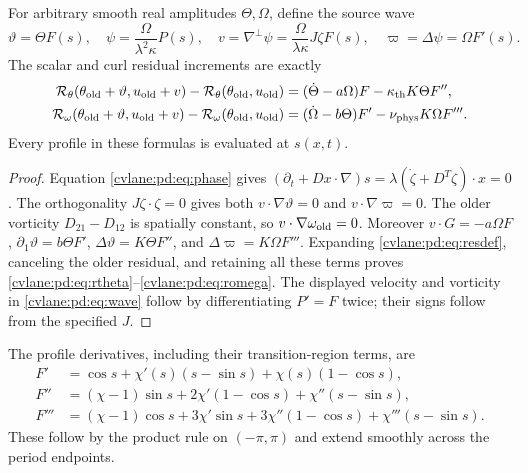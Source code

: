 \begin{cvlanepdproposition}\label{cvlane:pd:prop:res}
For arbitrary smooth real amplitudes $\Theta,\Omega$, define the source wave
\begin{equation}\label{cvlane:pd:eq:wave}
 \vartheta=\Theta F(s),\quad
 \psi=\frac{\Omega}{\lambda^2\kappa}P(s),\quad
 v=\nabla^\perp\psi=\frac{\Omega}{\lambda\kappa}J\zeta F(s),\quad
 \varpi=\Delta\psi=\Omega F'(s).
\end{equation}
The scalar and curl residual increments are exactly
\begin{align}
 \mathcal R_\theta(\theta_{\rm old}+\vartheta,u_{\rm old}+v)
  -\mathcal R_\theta(\theta_{\rm old},u_{\rm old})
   &=(\dot\Theta-a\Omega)F-\kappa_{\rm th} K\Theta F'',\label{cvlane:pd:eq:rtheta}\\
 \mathcal R_\omega(\theta_{\rm old}+\vartheta,u_{\rm old}+v)
  -\mathcal R_\omega(\theta_{\rm old},u_{\rm old})
   &=(\dot\Omega-b\Theta)F'-\nu_{\rm phys} K\Omega F'''.\label{cvlane:pd:eq:romega}
\end{align}
Every profile in these formulas is evaluated at $s(x,t)$.
\end{cvlanepdproposition}
\begin{proof}
Equation \eqref{cvlane:pd:eq:phase} gives
$(\partial_t+Dx\cdot\nabla)s=
\lambda(\dot\zeta+D^T\zeta)\cdot x=0$.
The orthogonality $J\zeta\cdot\zeta=0$ gives both
$v\cdot\nabla\vartheta=0$ and $v\cdot\nabla\varpi=0$.
The older vorticity $D_{21}-D_{12}$ is spatially constant, so
$v\cdot\nabla\omega_{\rm old}=0$.
Moreover $v\cdot G=-a\Omega F$,
$\partial_1\vartheta=b\Theta F'$,
$\Delta\vartheta=K\Theta F''$, and
$\Delta\varpi=K\Omega F'''$.
Expanding \eqref{cvlane:pd:eq:resdef}, canceling the older residual, and retaining all
these terms proves \eqref{cvlane:pd:eq:rtheta}--\eqref{cvlane:pd:eq:romega}.
The displayed velocity and vorticity in \eqref{cvlane:pd:eq:wave} follow by
differentiating $P'=F$ twice; their signs follow from the specified $J$.
\end{proof}

The profile derivatives, including their transition-region terms, are
\begin{align}
 F'&=\cos s+\chi'(s)(s-\sin s)+\chi(s)(1-\cos s),\label{cvlane:pd:eq:dF}\\
 F''&=(\chi-1)\sin s+2\chi'(1-\cos s)+\chi''(s-\sin s),\label{cvlane:pd:eq:ddF}\\
 F'''&=(\chi-1)\cos s+3\chi'\sin s
              +3\chi''(1-\cos s)+\chi'''(s-\sin s).\label{cvlane:pd:eq:dddF}
\end{align}
These follow by the product rule on $(-\pi,\pi)$ and extend smoothly
across the period endpoints.

